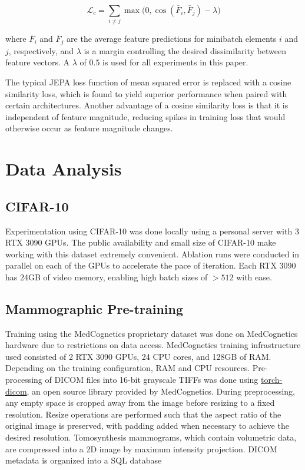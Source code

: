 \documentclass[12pt]{article}
\begin{document}
\begin{equation}
  \mathcal{L}_c = \sum_{i \neq j} \max\Big(0, \cos\left(\bar{F}_i, \bar{F}_j\right) - \lambda\Big)
\end{equation}

where $\bar{F}_i$ and $\bar{F}_j$ are the average feature predictions for minibatch elements $i$ and $j$, respectively, 
and $\lambda$ is a margin controlling the desired dissimilarity between feature vectors. A $\lambda$ of $0.5$ is used for all experiments in this paper.

The typical JEPA loss function of mean squared error is replaced with a cosine similarity loss, which is found to yield superior performance when paired
with certain architectures. Another advantage of a cosine similarity loss is that it is independent of feature magnitude, reducing spikes in training
loss that would otherwise occur as feature magnitude changes.




\section{Data Analysis}
\noindent

\subsection{CIFAR-10}

Experimentation using CIFAR-10 was done locally using a personal server with 3 RTX 3090 GPUs. The public availability and small size of CIFAR-10 make working
with this dataset extremely convenient. Ablation runs were conducted in parallel on each of the GPUs to accelerate the pace of iteration. Each RTX 3090 has 24GB of
video memory, enabling high batch sizes of $> 512$ with ease. 


\subsection{Mammographic Pre-training}

Training using the MedCognetics proprietary dataset was done on MedCognetics hardware due to restrictions on data access. MedCognetics training infrastructure
used consisted of 2 RTX 3090 GPUs, 24 CPU cores, and 128GB of RAM. Depending on the training configuration, RAM and CPU resources. Pre-processing of DICOM files
into 16-bit grayscale TIFFs was done using \href{https://github.com/medcognetics/torch-dicom}{torch-dicom}, an open source library provided by MedCognetics.
During preprocessing, any empty space is cropped away from the image before resizing to a fixed resolution. Resize operations are performed such that the aspect
ratio of the original image is preserved, with padding added when necessary to achieve the desired resolution. Tomosynthesis mammograms, which contain volumetric
data, are compressed into a 2D image by maximum intensity projection. DICOM metadata is organized into a SQL database
\end{document}
